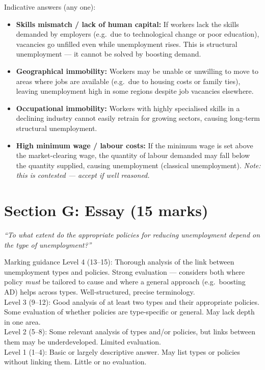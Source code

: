 \documentclass[12pt,a4paper]{article}
\begin{document}
\begin{enumerate}[leftmargin=*, label=\textbf{\arabic*.}]
    \vspace{0.3em}
    Indicative answers (any one):
    \begin{itemize}
        \item \textbf{Skills mismatch / lack of human capital:} If workers lack the skills demanded by employers (e.g.\ due to technological change or poor education), vacancies go unfilled even while unemployment rises. This is structural unemployment --- it cannot be solved by boosting demand.
        \item \textbf{Geographical immobility:} Workers may be unable or unwilling to move to areas where jobs are available (e.g.\ due to housing costs or family ties), leaving unemployment high in some regions despite job vacancies elsewhere.
        \item \textbf{Occupational immobility:} Workers with highly specialised skills in a declining industry cannot easily retrain for growing sectors, causing long-term structural unemployment.
        \item \textbf{High minimum wage / labour costs:} If the minimum wage is set above the market-clearing wage, the quantity of labour demanded may fall below the quantity supplied, causing unemployment (classical unemployment). \textit{Note: this is contested --- accept if well reasoned.}
    \end{itemize}

\end{enumerate}

\newpage

\section*{Section G: Essay (15 marks)}

\textit{``To what extent do the appropriate policies for reducing unemployment depend on the type of unemployment?''}

\vspace{0.5em}

\begin{extract}{Marking guidance}
    Level 4 (13--15): Thorough analysis of the link between unemployment types and policies. Strong evaluation --- considers both where policy \textit{must} be tailored to cause and where a general approach (e.g.\ boosting AD) helps across types. Well-structured, precise terminology.\\[0.4em]
    Level 3 (9--12): Good analysis of at least two types and their appropriate policies. Some evaluation of whether policies are type-specific or general. May lack depth in one area.\\[0.4em]
    Level 2 (5--8): Some relevant analysis of types and/or policies, but links between them may be underdeveloped. Limited evaluation.\\[0.4em]
    Level 1 (1--4): Basic or largely descriptive answer. May list types or policies without linking them. Little or no evaluation.
\end{extract}
\end{document}
